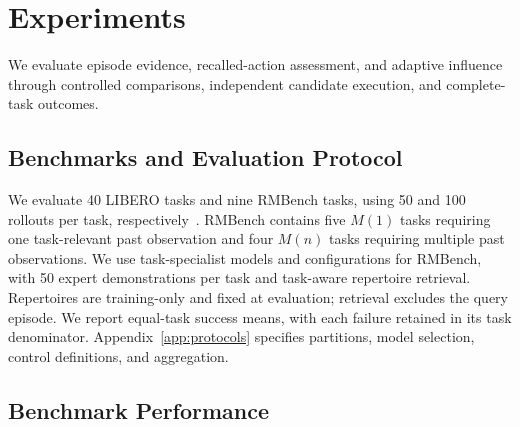 \section{Experiments}
\label{sec:experiments}
We evaluate episode evidence, recalled-action assessment, and adaptive influence through controlled comparisons, independent candidate execution, and complete-task outcomes.

\subsection{Benchmarks and Evaluation Protocol}
\label{sec:protocol}
We evaluate 40 LIBERO tasks and nine RMBench tasks, using 50 and 100 rollouts per task, respectively~\citep{liu2023libero,chen2026rmbench}.
RMBench contains five $M(1)$ tasks requiring one task-relevant past observation and four $M(n)$ tasks requiring multiple past observations.
We use task-specialist models and configurations for RMBench, with 50 expert demonstrations per task and task-aware repertoire retrieval.
Repertoires are training-only and fixed at evaluation; retrieval excludes the query episode.
We report equal-task success means, with each failure retained in its task denominator. Appendix~\ref{app:protocols} specifies partitions, model selection, control definitions, and aggregation.

\subsection{Benchmark Performance}
\label{sec:benchmark_results}
